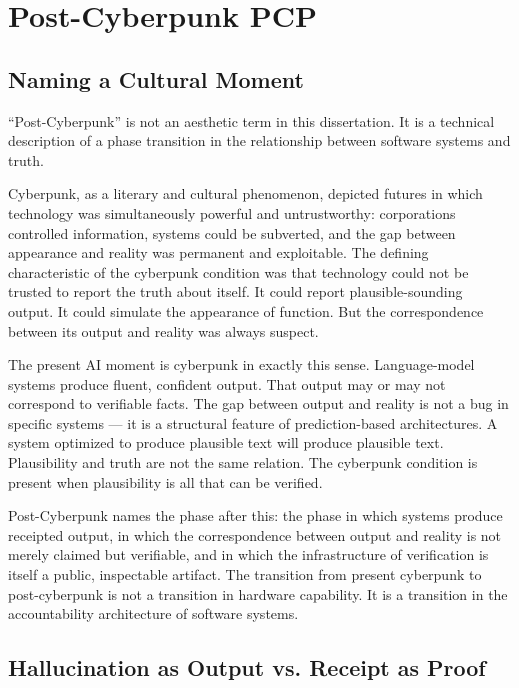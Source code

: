 \chapter{Post-Cyberpunk PCP}
\label{chap:post_cyberpunk}

\section{Naming a Cultural Moment}

``Post-Cyberpunk'' is not an aesthetic term in this dissertation. It is a technical description of a phase transition in the relationship between software systems and truth.

Cyberpunk, as a literary and cultural phenomenon, depicted futures in which technology was simultaneously powerful and untrustworthy: corporations controlled information, systems could be subverted, and the gap between appearance and reality was permanent and exploitable. The defining characteristic of the cyberpunk condition was that technology could not be trusted to report the truth about itself. It could report plausible-sounding output. It could simulate the appearance of function. But the correspondence between its output and reality was always suspect.

The present AI moment is cyberpunk in exactly this sense. Language-model systems produce fluent, confident output. That output may or may not correspond to verifiable facts. The gap between output and reality is not a bug in specific systems --- it is a structural feature of prediction-based architectures. A system optimized to produce plausible text will produce plausible text. Plausibility and truth are not the same relation. The cyberpunk condition is present when plausibility is all that can be verified.

Post-Cyberpunk names the phase after this: the phase in which systems produce receipted output, in which the correspondence between output and reality is not merely claimed but verifiable, and in which the infrastructure of verification is itself a public, inspectable artifact. The transition from present cyberpunk to post-cyberpunk is not a transition in hardware capability. It is a transition in the accountability architecture of software systems.

\section{Hallucination as Output vs. Receipt as Proof}


